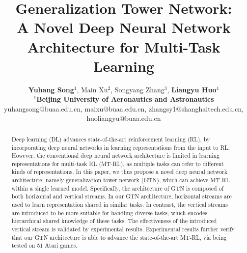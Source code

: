 \documentclass[letterpaper]{article} %
\begin{document}
%


\newcommand{\argmin}{\operatornamewithlimits{argmin}}
\newcommand{\argmax}{\operatornamewithlimits{argmax}}

\newcommand{\tabincell}[2]{\begin{tabular}{@{}#1@{}}#2\end{tabular}}

\newtheorem{theorem}{$\textbf{Theorem}$}
\newtheorem{lemma}[theorem]{$\textbf{Lemma}$}

\def\abovestrut#1{\rule[0in]{0in}{#1}\ignorespaces}
\def\belowstrut#1{\rule[-#1]{0in}{#1}\ignorespaces}
\def\abovespace{\abovestrut{0.01in}}
\def\belowspace{\belowstrut{-0.01in}}

\title{Generalization Tower Network: \\
A Novel Deep Neural Network Architecture for Multi-Task Learning}
\author{\textbf{Yuhang Song}$^1$, Main Xu$^2$, Songyang Zhang$^3$, \textbf{Liangyu Huo}$^4$ \\
	$^{1}$\textbf{Beijing University of Aeronautics and Astronautics}\\
	yuhangsong@buaa.edu.cn, maixu@buaa.edu.cn, zhangsy1@shanghaitech.edu.cn, huoliangyu@buaa.edu.cn}
\maketitle
\begin{abstract}
Deep learning (DL) advances state-of-the-art reinforcement learning (RL), by incorporating deep neural networks in learning representations from the input to RL. However, the conventional deep neural network architecture is limited in learning representations for multi-task RL (MT-RL), as multiple tasks can refer to different kinds of representations. In this paper, we thus propose a novel deep neural network architecture, namely generalization tower network (GTN), which can achieve MT-RL within a single learned model. Specifically, the architecture of GTN is composed of both horizontal and vertical streams. In our GTN architecture, horizontal streams are used to learn representation shared in similar tasks. In contrast, the vertical streams are introduced to be more suitable for handling diverse tasks, which encodes hierarchical shared knowledge of these tasks. The effectiveness of the introduced vertical stream is validated by experimental results. Experimental results further verify that our GTN architecture is able to advance the state-of-the-art MT-RL, via being tested on 51 Atari games.
\end{abstract}
\end{document}
